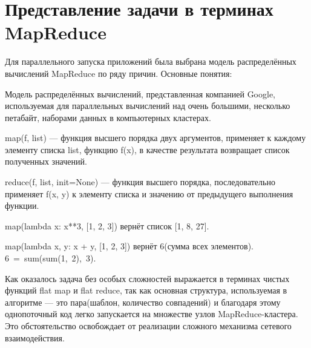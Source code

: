 \section{Представление задачи в терминах MapReduce}
Для параллельного запуска приложений была выбрана модель распределённых
вычислений MapReduce по ряду причин. Основные понятия:

\begin{definition}[MapReduce]
  Модель распределённых вычислений, представленная
  компанией Google, используемая для параллельных вычислений над очень
  большими, несколько петабайт, наборами данных в компьютерных кластерах.
\end{definition}
\begin{definition}[Map]
  map(f, list) --- функция высшего порядка двух аргументов, применяет к каждому
  элементу списка list, функцию f(x), в качестве результата возвращает список
  полученных значений.
\end{definition}

\begin{definition}[Reduce]
  reduce(f, list, init=None) --- функция высшего порядка, последовательно
  применяет f(x, y) к элементу списка и значению от предыдущего выполнения
  функции.
\end{definition}

\begin{example}
  map(lambda x: x**3, [1, 2, 3]) вернёт список [1, 8, 27].
\end{example}
\begin{example}
  map(lambda x, y: x + y, [1, 2, 3]) вернёт 6(сумма всех элементов).
  6~=~sum(sum(1,~2),~3).
\end{example}

Как оказалось задача без особых сложностей выражается в терминах
чистых функций flat map и flat reduce, так как основная структура,
используемая в алгоритме --- это пара(шаблон, количество совпадений)
и благодаря этому однопоточный код легко запускается
на множестве узлов MapReduce-кластера. Это обстоятельство освобождает
от реализации сложного механизма сетевого взаимодействия.

